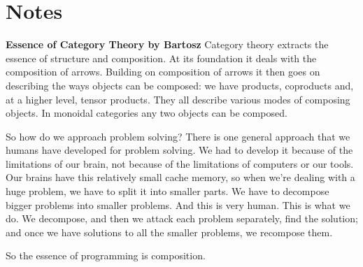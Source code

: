 \chapter{Notes}

\textbf{Essence of Category Theory by Bartosz}
Category theory extracts the essence of structure and composition. At its foundation it deals with the composition of arrows. Building on composition of arrows it then goes on describing the ways objects can be composed: we have products, coproducts and, at a higher level, tensor products. They all describe various modes of composing objects. In monoidal categories any two objects can be composed.

So how do we approach problem solving? There is one general approach that we humans have developed for problem solving. We had to develop it because of the limitations of our brain, not because of the limitations of computers or our tools. Our brains have this relatively small cache memory, so when we’re dealing with a huge problem, we have to split it into smaller parts. We have to decompose bigger problems into smaller problems. And this is very human. This is what we do. We decompose, and then we attack each problem separately, find the solution; and once we have solutions to all the smaller problems, we recompose them.

So the essence of programming is composition.